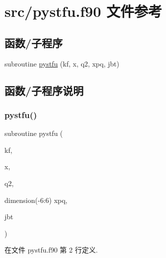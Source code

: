\hypertarget{pystfu_8f90}{}\section{src/pystfu.f90 文件参考}
\label{pystfu_8f90}
\subsection*{函数/子程序}
\begin{DoxyCompactItemize}
\item 
subroutine \mbox{\hyperlink{pystfu_8f90_ab0e0df59c24e16aa2077468a12ecb07e}{pystfu}} (kf, x, q2, xpq, jbt)
\end{DoxyCompactItemize}


\subsection{函数/子程序说明}
\mbox{\label{pystfu_8f90_ab0e0df59c24e16aa2077468a12ecb07e}} 
\subsubsection{\texorpdfstring{pystfu()}{pystfu()}}
{\footnotesize\ttfamily subroutine pystfu (\begin{DoxyParamCaption}\item[{}]{kf,  }\item[{}]{x,  }\item[{}]{q2,  }\item[{dimension(-\/6\+:6)}]{xpq,  }\item[{}]{jbt }\end{DoxyParamCaption})}



在文件 pystfu.\+f90 第 2 行定义.

